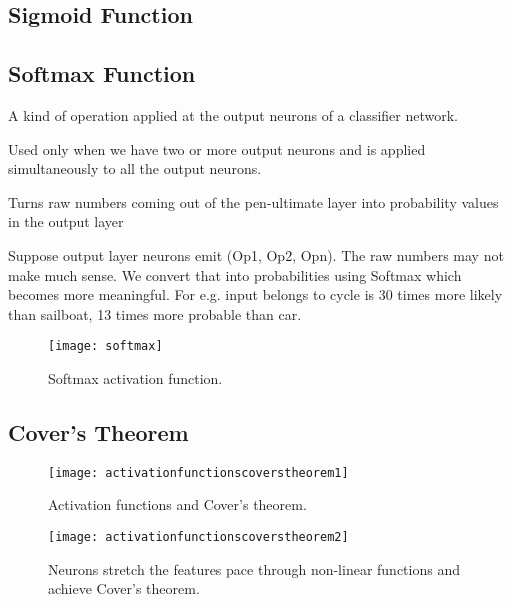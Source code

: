 	\subsection{Sigmoid Function}

	\subsection{Softmax Function}
	\begin{bulletedlist}
		\item A kind of operation applied at the output neurons of a classifier network.
		\item Used only when we have two or more output neurons and is applied simultaneously to all the output neurons.
		\item Turns raw numbers coming out of the pen-ultimate layer into probability values in the output layer
		\item Suppose output layer neurons emit (Op1, Op2, Opn). The raw numbers may not make much sense. We convert that into probabilities using Softmax which becomes more meaningful. For e.g. input belongs to cycle is 30 times more likely than sailboat, 13 times more probable than car.
	\end{bulletedlist}

 	\begin{figure}[h]
		\centering
		\texttt{[image: softmax]}
		\caption[Softmax activation function]{Softmax activation function.}
		\label{fig:softmax}
	\end{figure}


	\subsection{Cover's Theorem}

 	\begin{figure}[h]
		\centering
		\texttt{[image: activationfunctionscoverstheorem1]}
		\caption[Activation functions and Cover's theorem]{Activation functions and Cover's theorem.}
		\label{fig:activationfunctionscoverstheorem1}
	\end{figure}
 	\begin{figure}[h]
		\centering
		\texttt{[image: activationfunctionscoverstheorem2]}
		\caption[Neurons stretch features to achieve Cover's theorem]{Neurons stretch the features pace through non-linear functions and achieve Cover's theorem.}
		\label{fig:activationfunctionscoverstheorem2}
	\end{figure}

